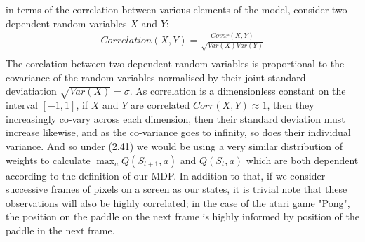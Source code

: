 in terms of the correlation between various elements of the model, consider
two dependent random variables $X$ and $Y$:
\begin{equation}
    \begin{gathered}
        Correlation(X,Y) = \frac{Covar(X,Y)}{\sqrt{Var(X)Var(Y)}} \\
    \end{gathered}
\end{equation}
The corelation between two dependent random variables is proportional to the covariance of
the random variables normalised by their joint standard deviatiation $\sqrt{Var(X)}= \sigma$.
As correlation is a dimensionless constant on the interval $[-1,1]$, if $X$ and $Y$ are
correlated $Corr(X,Y) \approx 1$, then they increasingly co-vary across each dimension, then their
standard deviation must increase likewise, and as the co-variance goes to infinity, so does their
individual variance. And so under (2.41) we would be using a very similar distribution of
weights to calculate $\max_a Q(S_{t+1}, a)$ and $Q(S_{t}, a)$ which are both dependent 
according to the definition of our MDP. In addition to that, if we consider
successive frames of pixels on a screen as our states, it is trivial note that these
observations will also be highly correlated; in the case of the atari game "Pong", the
position on the paddle on the next frame is highly informed by position of the paddle in the next frame.


